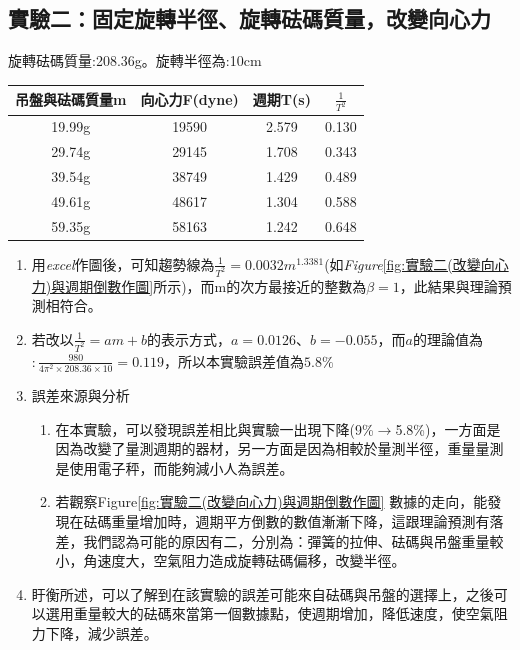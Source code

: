 \documentclass[12pt]{article}
\begin{document}
\subsection{\textbf{實驗二}：固定旋轉半徑、旋轉砝碼質量，改變向心力}
旋轉砝碼質量:208.36g。旋轉半徑為:10cm
\begin{table}[h]
\centering
\begin{tabular}{cccc}
\hline
吊盤與砝碼質量m & 向心力F(dyne) & 週期T(s) & $\frac{1}{T^2}$ \\ \hline
19.99g   & 19590      & 2.579  & 0.130           \\
29.74g   & 29145      & 1.708  & 0.343           \\
39.54g   & 38749      & 1.429  & 0.489           \\
49.61g   & 48617      & 1.304  & 0.588           \\
59.35g   & 58163      & 1.242  & 0.648           \\ \hline
\end{tabular}
\end{table}

\begin{enumerate}
    \item 用\textit{excel}作圖後，可知趨勢線為$\frac{1}{T^2}=0.0032m^{1.3381}$(如\textit{Figure}\ref{fig:實驗二(改變向心力)與週期倒數作圖}所示)，而m的次方最接近的整數為$\beta=1$，此結果與理論預測相符合。
    \item 若改以$\frac{1}{T^2}=am+b$的表示方式，$a=0.0126$、$b=-0.055$，而$a$的理論值為$:\frac{980}{4\pi^2\times208.36\times10}=0.119$，所以本實驗誤差值為$5.8\%$

    \item 誤差來源與分析
    
    \begin{enumerate}
        \item 在本實驗，可以發現誤差相比與實驗一出現下降(9\%$\rightarrow$5.8\%)，一方面是因為改變了量測週期的器材，另一方面是因為相較於量測半徑，重量量測是使用電子秤，而能夠減小人為誤差。
        \item 若觀察Figure\ref{fig:實驗二(改變向心力)與週期倒數作圖} 數據的走向，能發現在砝碼重量增加時，週期平方倒數的數值漸漸下降，這跟理論預測有落差，我們認為可能的原因有二，分別為：彈簧的拉伸、砝碼與吊盤重量較小，角速度大，空氣阻力造成旋轉砝碼偏移，改變半徑。
    \end{enumerate}

    \item 盱衡所述，可以了解到在該實驗的誤差可能來自砝碼與吊盤的選擇上，之後可以選用重量較大的砝碼來當第一個數據點，使週期增加，降低速度，使空氣阻力下降，減少誤差。
\end{enumerate}
\end{document}
